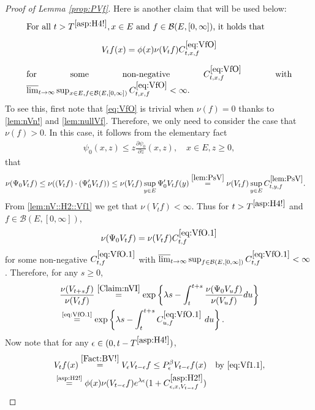 \documentclass[12pt,a4paper]{amsart}
\numberwithin{equation}{section}
\theoremstyle{plain}
\theoremstyle{definition}
\theoremstyle{remark}
\begin{document}
\begin{proof}[Proof of Lemma \ref{prop:PVf}]
	
	Here is another claim that will be used below:
\begin{equation}
\begin{minipage}{0.9\textwidth}
	For all $t> T^{\eqref{asp:H4!}}, x\in E$ and $f\in \mathcal B(E,[0,\infty])$, it holds that \[V_t f(x) = \phi(x) \nu(V_tf) C^{\eqref{eq:VfO}}_{t,x,f}\] for some non-negative $C^{\eqref{eq:VfO}}_{t,x,f}$ with $\varlimsup_{t\to \infty} \sup_{x\in E, f\in \mathcal B(E,[0,\infty])} C^{\eqref{eq:VfO}}_{t,x,f} <\infty$.
\end{minipage} \label{eq:VfO}
\end{equation}
	To see this, first note that \eqref{eq:VfO} is trivial when $\nu(f) = 0$ thanks to \eqref{lem:nVn!} and \eqref{lem:nullVf}.
	Therefore, we only need to consider the case that $\nu(f)>0$.
	In this case, it follows from the elementary fact
\begin{align}\label{e:derofpsi0}
	\psi_0(x,z)
	\leq z \frac{\partial \psi_0}{\partial z}(x,z),
	\quad x\in E, z\geq 0,
\end{align}
	that
\begin{align}
	&\nu(\Psi_0 V_tf)
	\leq \nu((V_tf)\cdot (\Psi_0' V_tf)) \leq \nu(V_tf) \sup_{y\in E} \Psi_0' V_tf(y)
	\overset{\eqref{lem:PsV}}= \nu(V_tf) \sup_{y\in E} C^{\eqref{lem:PsV}}_{t,y,f}.
\end{align}
	From \eqref{lem:nV::H2::Vf1}  we get that $\nu(V_tf) <\infty$.
	Thus for $t> T^{\eqref{asp:H4!}}$ and $f\in \mathcal B(E,[0,\infty])$,
\begin{equation}
	\nu(\Psi_0 V_t f)  = \nu(V_tf) C^{\eqref{eq:VfO.1}}_{t,f} \label{eq:VfO.1}
\end{equation}
	for some non-negative $C^{\eqref{eq:VfO.1}}_{t,f} $ with $\varlimsup_{t\to \infty} \sup_{f\in \mathcal B(E,[0,\infty])}C^{\eqref{eq:VfO.1}}_{t,f}  < \infty$.
	Therefore, for any $s\geq 0$,
\begin{align}
	&  \frac{\nu(V_{t+s} f)} {\nu(V_t f)} \overset{\eqref{Claim:nVI}}= \exp\left\{ \lambda s - \int_t^{t+s} \frac{\nu(\Psi_0 V_u f) }{\nu(V_u f)} du\right\}
	\\&\label{eq:VfO.2} \overset{\text{\eqref{eq:VfO.1}}}= \exp\left\{ \lambda s - \int_t^{t+s} C^{\eqref{eq:VfO.1}}_{u,f} ~du\right\}.
\end{align}
Now note that for any $\epsilon\in (0, t- T^{\eqref{asp:H4!}})$,
\begin{align}
	&V_{t}f(x) \overset{\eqref{Fact:BV!}}= V_{\epsilon} V_{t-\epsilon} f\leq P_\epsilon^\beta V_{t-\epsilon} f(x)\quad\text{by \eqref{eq:Vf1.1}},
	\\& \overset{\text{\eqref{asp:H2!}}}= \phi(x) \nu(V_{t-\epsilon}f) e^{\lambda  \epsilon} (1+C_{\epsilon,x, V_{t-\epsilon} f}^{\eqref{asp:H2!}} )

\end{align}
\end{proof}
\end{document}
